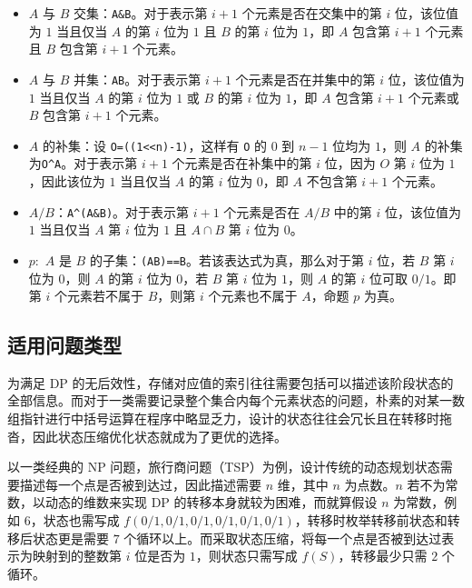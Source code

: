 \documentclass[a4paper, UTF8]{ctexart}
\begin{document}
\begin{itemize}
\tightlist
\item
  \(A\) 与 \(B\) 交集：\texttt{A\&B}。对于表示第 \(i+1\)
  个元素是否在交集中的第 \(i\) 位，该位值为 \(1\) 当且仅当 \(A\) 的第
  \(i\) 位为 \(1\) 且 \(B\) 的第 \(i\) 位为 \(1\)，即 \(A\) 包含第
  \(i+1\) 个元素且 \(B\) 包含第 \(i+1\) 个元素。
\item
  \(A\) 与 \(B\) 并集：\texttt{A\textbar{}B}。对于表示第 \(i+1\)
  个元素是否在并集中的第 \(i\) 位，该位值为 \(1\) 当且仅当 \(A\) 的第
  \(i\) 位为 \(1\) 或 \(B\) 的第 \(i\) 位为 \(1\)，即 \(A\) 包含第
  \(i+1\) 个元素或 \(B\) 包含第 \(i+1\) 个元素。
\item
  \(A\) 的补集：设 \texttt{O=((1\textless{}\textless{}n)-1)}，这样有
  \texttt{O} 的 \(0\) 到 \(n-1\) 位均为 \(1\)，则 \(A\)
  的补集为\texttt{O\^{}A}。对于表示第 \(i+1\) 个元素是否在补集中的第
  \(i\) 位，因为 \(O\) 第 \(i\) 位为 \(1\)，因此该位为 \(1\) 当且仅当
  \(A\) 的第 \(i\) 位为 \(0\)，即 \(A\) 不包含第 \(i+1\) 个元素。
\item
  \(A/B\)：\texttt{A\^{}(A\&B)}。对于表示第 \(i+1\) 个元素是否在 \(A/B\)
  中的第 \(i\) 位，该位值为 \(1\) 当且仅当 \(A\) 第 \(i\) 位为 \(1\) 且
  \(A\cap B\) 第 \(i\) 位为 \(0\)。
\item
  \(p:\) \(A\) 是 \(B\)
  的子集：\texttt{(A\textbar{}B)==B}。若该表达式为真，那么对于第 \(i\)
  位，若 \(B\) 第 \(i\) 位为 \(0\)，则 \(A\) 的第 \(i\) 位为 \(0\)，若
  \(B\) 第 \(i\) 位为 \(1\)，则 \(A\) 的第 \(i\) 位可取 \(0/1\)。即第
  \(i\) 个元素若不属于 \(B\)，则第 \(i\) 个元素也不属于 \(A\)，命题
  \(p\) 为真。
\end{itemize}

\subsection{适用问题类型}

为满足 DP
的无后效性，存储对应值的索引往往需要包括可以描述该阶段状态的全部信息。而对于一类需要记录整个集合内每个元素状态的问题，朴素的对某一数组指针进行中括号运算在程序中略显乏力，设计的状态往往会冗长且在转移时拖沓，因此状态压缩优化状态就成为了更优的选择。

以一类经典的 NP
问题，旅行商问题（TSP）为例，设计传统的动态规划状态需要描述每一个点是否被到达过，因此描述需要
\(n\) 维，其中 \(n\) 为点数。\(n\) 若不为常数，以动态的维数来实现 DP
的转移本身就较为困难，而就算假设 \(n\) 为常数，例如 \(6\)，状态也需写成
\(f(0/1,0/1,0/1,0/1,0/1,0/1)\)，转移时枚举转移前状态和转移后状态更是需要
\(7\)
个循环以上。而采取状态压缩，将每一个点是否被到达过表示为映射到的整数第
\(i\) 位是否为 \(1\)，则状态只需写成 \(f(S)\)，转移最少只需 \(2\)
个循环。
\end{document}
